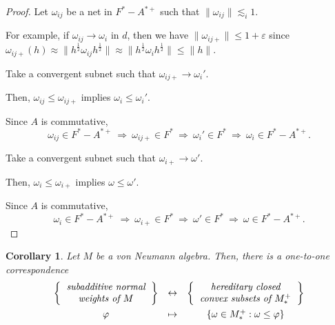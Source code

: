 \documentclass[a4paper]{amsart}
\newcommand{\e}{\varepsilon}
\theoremstyle{plain}
\newtheorem{cor}[thm]{Corollary}
\theoremstyle{definition}
\begin{document}
\begin{proof}
Let $\omega_{ij}$ be a net in $F^*-A^{*+}$ such that $\|\omega_{ij}\|\lesssim_i1$.

For example, if $\omega_{ij}\to\omega_i$ in $d$, then we have $\|\omega_{ij+}\|\le1+\e$ since $\omega_{ij+}(h)\approx\|h^{\frac12}\omega_{ij}h^{\frac12}\|\approx\|h^{\frac12}\omega_ih^{\frac12}\|\le\|h\|$.

Take a convergent subnet such that $\omega_{ij+}\to\omega_i'$.

Then, $\omega_{ij}\le\omega_{ij+}$ implies $\omega_i\le\omega_i'$.

Since $A$ is commutative,
\[\omega_{ij}\in F^*-A^{*+}\ \Rightarrow\ 
\omega_{ij+}\in F^*\ \Rightarrow\ 
\omega_i'\in F^*\ \Rightarrow\ 
\omega_i\in F^*-A^{*+}.\]


Take a convergent subnet such that $\omega_{i+}\to\omega'$.

Then, $\omega_i\le\omega_{i+}$ implies $\omega\le\omega'$.

Since $A$ is commutative,
\[\omega_i\in F^*-A^{*+}\ \Rightarrow\ 
\omega_{i+}\in F^*\ \Rightarrow\ 
\omega'\in F^*\ \Rightarrow\ 
\omega\in F^*-A^{*+}.\]



\end{proof}




\begin{cor}
Let $M$ be a von Neumann algebra.
Then, there is a one-to-one correspondence
\[\begin{array}{ccc}
\left\{\emph{\begin{tabular}{c}subadditive normal\\weights of $M$\end{tabular}}\right\}&\leftrightarrow&\left\{\emph{\begin{tabular}{c}hereditary closed\\convex subsets of $M_*^+$\end{tabular}}\right\}\\[10pt]
\varphi&\mapsto&\{\omega\in M_*^+:\omega\le\varphi\}
\end{array}\]
\end{cor}
\end{document}
